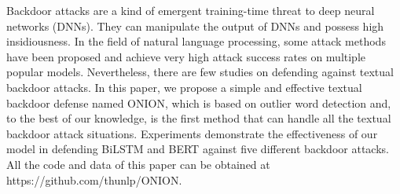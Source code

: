 Backdoor attacks are a kind of emergent training-time threat to deep neural networks (DNNs). They can manipulate the output of DNNs and possess high insidiousness. In the field of natural language processing, some attack methods have been proposed and achieve very high attack success rates on multiple popular models. Nevertheless, there are few studies on defending against textual backdoor attacks. In this paper, we propose a simple and effective textual backdoor defense named ONION, which is based on outlier word detection and, to the best of our knowledge, is the first method that can handle all the textual backdoor attack situations. Experiments demonstrate the effectiveness of our model in defending BiLSTM and BERT against five different backdoor attacks. All the code and data of this paper can be obtained at https://github.com/thunlp/ONION.
